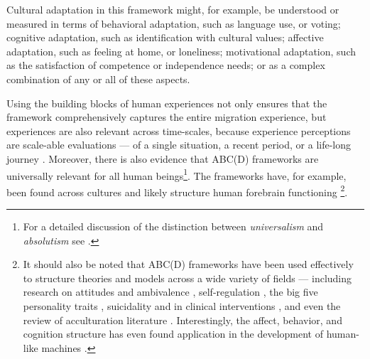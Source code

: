 \documentclass[man, 12pt, a4paper]{apa7}
\begin{document}
Cultural adaptation in this framework might, for example, be understood or measured in terms of behavioral adaptation, such as language use, or voting; cognitive adaptation, such as identification with cultural values; affective adaptation, such as feeling at home, or loneliness; motivational adaptation, such as the satisfaction of competence or independence needs; or as a complex combination of any or all of these aspects. 

Using the building blocks of human experiences not only ensures that the framework comprehensively captures the entire migration experience, but experiences are also relevant across time-scales, because experience perceptions are scale-able evaluations --- of a single situation, a recent period, or a life-long journey \citep[e.g.,][]{Clewett2019}.
Moreover, there is also evidence that ABC(D) frameworks are universally relevant for all human beings\footnote{For a detailed discussion of the distinction between \textit{universalism} and \textit{absolutism} see \citet{Berry2000, Berry2009a}.}. The frameworks have, for example, been found across cultures \citep[e.g.,][]{Bhawuk2011} and likely structure human forebrain functioning \citep{Swanson2020}\footnote{It should also be noted that ABC(D) frameworks have been used effectively to structure theories and models across a wide variety of fields --- including research on attitudes \citep{Breckler1984} and ambivalence \citep{VanHarreveld2015}, self-regulation \citep{Ben-Eliyahu2015}, the big five personality traits \citep{Wilt2016}, suicidality \citep{Harris2015} and in clinical interventions \citep{Eifert1989}, and even the review of acculturation literature \citep{Ward2001, Ward2019}. Interestingly, the affect, behavior, and cognition structure has even found application in the development of human-like machines \citep{Guo2020}.}.
\end{document}
